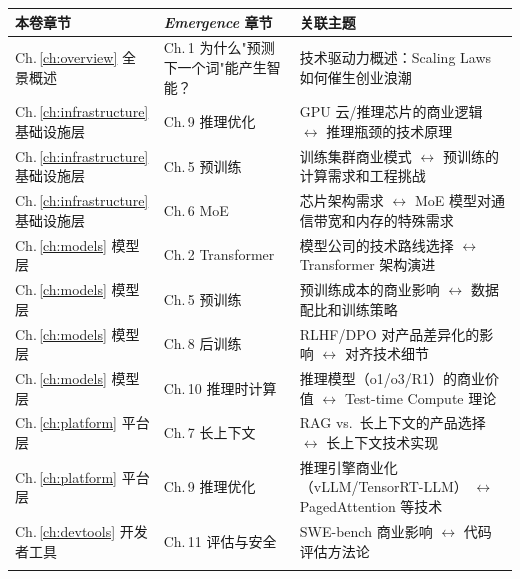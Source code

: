 \begin{tabularx}{\textwidth}{@{}l l X@{}}
\toprule
\rowcolor{figLightGray}
\textbf{本卷章节} & \textbf{\textit{Emergence} 章节} & \textbf{关联主题} \\
\midrule

Ch.\,\ref{ch:overview} 全景概述 &
Ch.\,1 为什么"预测下一个词"能产生智能？ &
技术驱动力概述：Scaling Laws 如何催生创业浪潮 \\
\addlinespace

Ch.\,\ref{ch:infrastructure} 基础设施层 &
Ch.\,9 推理优化 &
GPU 云/推理芯片的商业逻辑 $\leftrightarrow$ 推理瓶颈的技术原理 \\
\addlinespace

Ch.\,\ref{ch:infrastructure} 基础设施层 &
Ch.\,5 预训练 &
训练集群商业模式 $\leftrightarrow$ 预训练的计算需求和工程挑战 \\
\addlinespace

Ch.\,\ref{ch:infrastructure} 基础设施层 &
Ch.\,6 MoE &
芯片架构需求 $\leftrightarrow$ MoE 模型对通信带宽和内存的特殊需求 \\
\addlinespace

Ch.\,\ref{ch:models} 模型层 &
Ch.\,2 Transformer &
模型公司的技术路线选择 $\leftrightarrow$ Transformer 架构演进 \\
\addlinespace

Ch.\,\ref{ch:models} 模型层 &
Ch.\,5 预训练 &
预训练成本的商业影响 $\leftrightarrow$ 数据配比和训练策略 \\
\addlinespace

Ch.\,\ref{ch:models} 模型层 &
Ch.\,8 后训练 &
RLHF/DPO 对产品差异化的影响 $\leftrightarrow$ 对齐技术细节 \\
\addlinespace

Ch.\,\ref{ch:models} 模型层 &
Ch.\,10 推理时计算 &
推理模型（o1/o3/R1）的商业价值 $\leftrightarrow$ Test-time Compute 理论 \\
\addlinespace

Ch.\,\ref{ch:platform} 平台层 &
Ch.\,7 长上下文 &
RAG vs.\ 长上下文的产品选择 $\leftrightarrow$ 长上下文技术实现 \\
\addlinespace

Ch.\,\ref{ch:platform} 平台层 &
Ch.\,9 推理优化 &
推理引擎商业化（vLLM/TensorRT-LLM） $\leftrightarrow$ PagedAttention 等技术 \\
\addlinespace

Ch.\,\ref{ch:devtools} 开发者工具 &
Ch.\,11 评估与安全 &
SWE-bench 商业影响 $\leftrightarrow$ 代码评估方法论 \\
\addlinespace


\end{tabularx}
